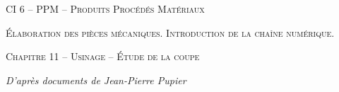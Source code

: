 \documentclass[11pt,oneside]{article}
\begin{document}
\pagestyle{fancy}
\renewcommand{\headrulewidth}{0pt}

\fancyhead{}


\fancyhead[C]{\rule{12cm}{.5pt}}


\renewcommand{\footrulewidth}{0.2pt}

\fancyfoot[C]{\footnotesize{\bfseries \thepage}}



\begin{center}
 \huge\textsc{CI 6 -- PPM -- Produits Procédés Matériaux}

 \large\textsc{Élaboration des pièces mécaniques. Introduction de la chaîne numérique.}
\end{center}

\begin{center}
 \LARGE\textsc{Chapitre 11 -- Usinage -- Étude de la coupe}
\end{center}

\begin{flushright}
\textit{D'après documents de Jean-Pierre Pupier}
\end{flushright}

\vspace{.5cm}
\end{document}

